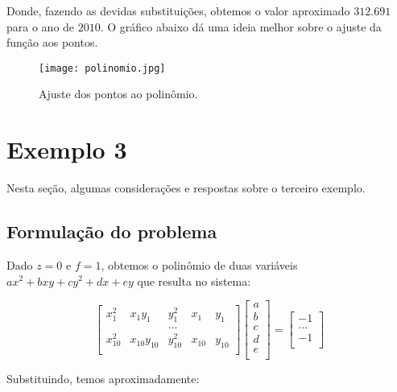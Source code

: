 \documentclass[12pt,a4paper]{article}
\begin{document}
Donde, fazendo as devidas substituições, obtemos o valor aproximado $312.691$ 
para o ano de $2010$. O gráfico abaixo dá uma ideia melhor sobre o ajuste da 
função aos pontos.

\begin{figure}[H]\centering
    \texttt{[image: polinomio.jpg]}
    \caption{Ajuste dos pontos ao polinômio.}
\end{figure}

\section{Exemplo 3}
Nesta seção, algumas considerações e respostas sobre o terceiro exemplo.
\subsection{Formulação do problema}
Dado $z = 0$ e $f = 1$, obtemos o polinômio de duas variáveis $ax^2 + bxy + cy^2 + dx + ey$ que resulta no sistema:

\[
\left[
\begin{array}{ccccc}
    x_{1}^2 & x_{1}y_{1} & y_{1}^{2} & x_{1} & y_{1} \\
     & & ... \\
    x_{10}^2 & x_{10}y_{10} & y_{10}^{2} & x_{10} & y_{10} \\
\end{array}
\right]
\left[
\begin{array}{c}
    a \\
    b \\
    c \\
    d \\
    e \\
\end{array}
\right]
=
\left[
\begin{array}{c}
    -1 \\
    ... \\
    -1 \\
\end{array}
\right]
\]

Substituindo, temos aproximadamente:
\end{document}
